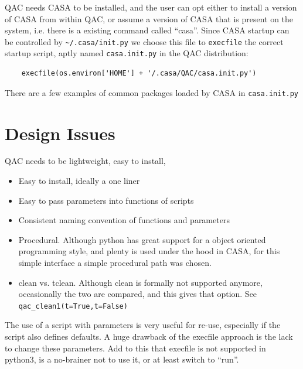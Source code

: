 \documentclass[11pt,twoside]{article}
\begin{document}
QAC needs CASA to be installed, and the user can opt either to install a version
of CASA from within QAC, or assume a version of CASA that is present on the system, i.e. there
is a existing command called ``casa''. Since CASA startup can be controlled by
\verb+~/.casa/init.py+ we choose this file to {\tt execfile} the correct startup script,
aptly named {\tt casa.init.py} in the QAC distribution:


\begin{verbatim}
    execfile(os.environ['HOME'] + '/.casa/QAC/casa.init.py')
\end{verbatim}

\noindent
There are a few examples of common packages loaded by CASA in {\tt casa.init.py}

\section{Design Issues}

QAC needs to be lightweight, easy to install,

\begin{itemize}

\item
  Easy to install, ideally a one liner

\item
  Easy to pass parameters into functions of scripts

\item
  Consistent naming convention of functions and parameters

\item
  Procedural. Although python has great support for a object oriented
  programming style, and plenty is used under the hood in CASA, for
  this simple interface a simple procedural path was chosen.

\item
  clean vs. tclean. Although clean is formally not supported anymore, occasionally the two are compared, and
  this gives that option. See \verb+qac_clean1(t=True,t=False)+
  
\end{itemize}

The use of a script with parameters is very useful for re-use, especially if the script also defines defaults. A huge
drawback of the execfile approach is the lack to change these parameters. Add to this that execfile is not supported
in python3, is a no-brainer not to use it, or at least switch to ``run''.
\end{document}
